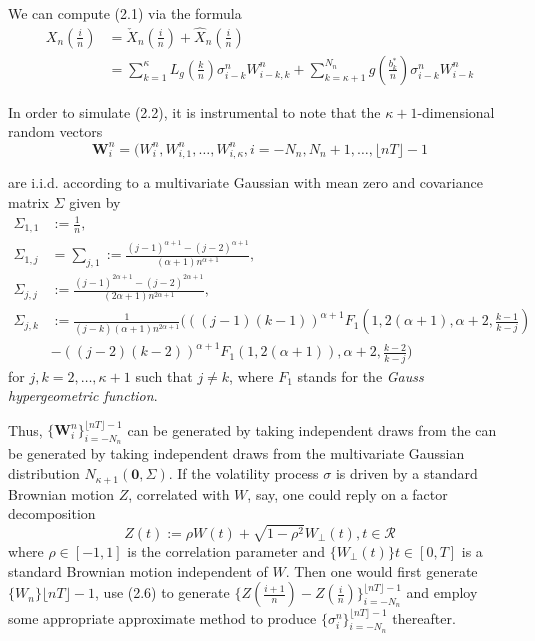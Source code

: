 \documentclass[12pt]{article}
\numberwithin{equation}{section}
\begin{document}
        We can compute (2.1) via the formula
        \begin{equation}
          \begin{split}
            X_n(\frac{i}{n}) &= \check{X}_n(\frac{i}{n}) + \hat{X}_n (\frac{i}{n}) \\
            &= \sum_{k=1}^{\kappa} L_g\left(\frac{k}{n}\right)\sigma_{i-k}^n W_{i-k,k}^n + \sum_{k=\kappa+1}^{N_n} g\left(\frac{b_k^*}{n}\right) \sigma_{i-k}^nW_{i-k}^n 
          \end{split}
        \end{equation}

        In order to simulate (2.2), it is instrumental to note that the $\kappa+1$-dimensional random vectors
        \begin{equation}
          \bm{W}_i^n = (W_i^n, W_{i,1}^n, \dots, W_{i, \kappa}^n, i = -N_n, N_n+1, \dots, \lfloor nT\rfloor-1
        \end{equation}

        are i.i.d. according to a multivariate Gaussian with mean zero and covariance matrix $\Sigma$ given by
        \begin{equation}
          \begin{split}
            \Sigma_{1,1} &:= \frac{1}{n}, \\
            \Sigma_{1,j} &= \sum_{j,1} := \frac{(j-1)^{\alpha+1}-(j-2)^{\alpha+1}}{(\alpha+1)n^{\alpha+1}}, \\
            \Sigma_{j,j} &:= \frac{(j-1)^{2\alpha+1}-(j-2)^{2\alpha+1}}{(2\alpha+1)n^{2\alpha+1}}, \\
            \Sigma_{j,k} &:= \frac{1}{(j-k)(\alpha+1)n^{2\alpha+1}} ( ((j-1)(k-1))^{\alpha+1} F_1(1,2(\alpha+1),\alpha+2,\frac{k-1}{k-j}) \\
            & - ((j-2)(k-2))^{\alpha+1} F_1(1,2(\alpha+1)),\alpha+2,\frac{k-2}{k-j}) 
          \end{split}
        \end{equation}
        for $j,k=2,\dots,\kappa+1$ such that $j\neq k$, where $F_1$ stands for the \textit{Gauss hypergeometric function}.

        Thus, $\{\bm{W}_i^n\}_{i=-N_n}^{\lfloor nT \rfloor -1}$ can be generated by taking independent draws from the can be generated by taking independent draws from the multivariate Gaussian distribution $N_{\kappa+1}(\bm{0}, \Sigma)$. If the volatility process $\sigma$ is driven by a standard Brownian motion $Z$, correlated with $W$, say, one could reply on a factor decomposition 
        \begin{equation}
          Z(t) := \rho W(t) + \sqrt{1-\rho^2} W_\bot (t), t\in\mathcal{R}
        \end{equation}
        where $\rho \in [-1,1]$ is the correlation parameter and $\{W_\bot(t)\}t\in[0,T]$ is a standard Brownian motion independent of $W$. Then one would first generate $\{W_n\}\lfloor nT\rfloor-1$, use (2.6) to generate $\{Z(\frac{i+1}{n}) - Z(\frac{i}{n})\}_{i=-N_n}^{\lfloor nT\rfloor-1}$ and employ some appropriate approximate method to produce $\{\sigma_i^n\}_{i=-N_n}^{\lfloor nT\rfloor-1}$ thereafter.
    
\end{document}
